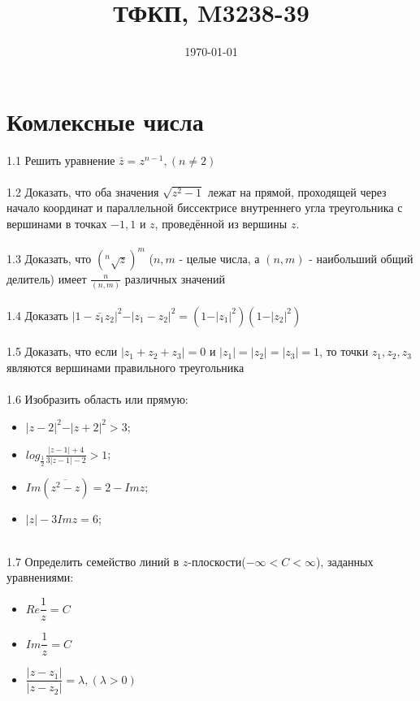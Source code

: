 \documentclass{article}
\title{ТФКП, M3238-39}
\date{\today}
\begin{document}
\maketitle

\section{Комлексные числа}
1.1 Решить уравнение $\bar{z} = z^{n-1}, (n \neq 2)$\\ \\
1.2 Доказать, что оба значения $\sqrt{z^2-1}$ лежат на прямой, проходящей через начало координат и параллельной биссектрисе внутреннего угла треугольника с вершинами в точках $-1, 1$ и $z$, проведённой из вершины $z$.\\ \\
1.3 Доказать, что $(^n\sqrt{z})^m$ ($n, m$ - целые числа, а $(n,m)$ - наибольший общий делитель) имеет $\frac{n}{(n, m)}$ различных значений \\ \\
1.4 Доказать $\vert 1 - \bar{z_1} z_2 \vert^2 - \vert z_1 - z_2 \vert ^2 = (1 - \vert z_1 \vert ^2) (1 - \vert z_2 \vert ^2)  $\\ \\
1.5 Доказать, что если $\vert z_1 + z_2 + z_3 \vert  = 0 $  и $\vert z_1 \vert = \vert z_2 \vert = \vert z_3 \vert= 1$, то точки $z_1, z_2, z_3$ являются вершинами правильного треугольника \\ \\
1.6 Изобразить область или прямую: \begin{itemize}
    \item $\vert z-2 \vert^2 - \vert z+2 \vert^2 > 3$;
    \item $log_{\frac{1}{2}}\frac{\vert z - 1 \vert + 4}{3\vert z - 1\vert -2} > 1$;
    \item ${Im}(\overline{z^2-z})=2-{Im} z$;
    \item $\vert z \vert - 3{Im} z=6$;
    \end{itemize}
    \\
1.7 Определить семейство линий в $z$-плоскости($-\infty < C < \infty$), заданных уравнениями:
\begin{itemize}
	\item $Re \dfrac{1}{z}=C$
	\item $Im \dfrac{1}{z}=C$
	\item $\dfrac{\vert z - z_1 \vert}{\vert z - z_2 \vert}=\lambda, (\lambda > 0)$
\end{itemize}
    
\end{document}
